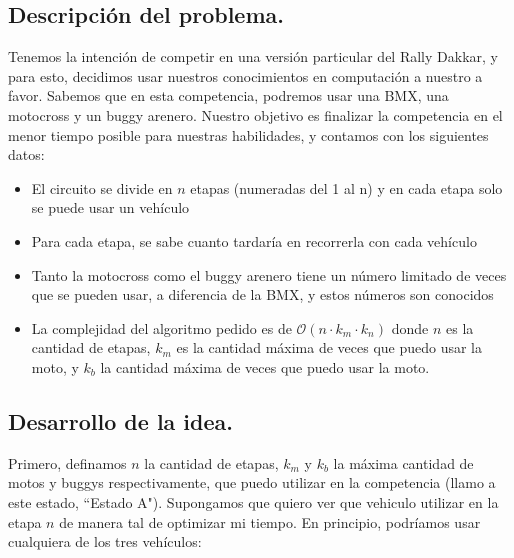 \subsection{Descripción del problema.}

\vspace*{0.3cm}

Tenemos la intención de competir en una versión particular del Rally Dakkar, y para esto, decidimos usar nuestros conocimientos en computación a nuestro a favor. Sabemos que en esta competencia, podremos usar una BMX, una motocross y un buggy arenero. Nuestro objetivo es finalizar la competencia en el menor tiempo posible para nuestras habilidades, y contamos con los siguientes datos:

\begin{itemize}

	\item El circuito se divide en $n$ etapas (numeradas del 1 al n) y en cada etapa solo se puede usar un vehículo
	\item Para cada etapa, se sabe cuanto tardaría en recorrerla con cada vehículo
	\item Tanto la motocross como el buggy arenero tiene un número limitado de veces que se pueden usar, a diferencia de la BMX, y estos números son conocidos
	\item La complejidad del algoritmo pedido es de $\mathcal{O}(n \cdot k_{m} \cdot k_{n})$ donde $n$ es la cantidad de etapas, $k_{m}$ es la cantidad máxima de veces que puedo usar la moto, y $k_{b}$ la cantidad máxima de veces que puedo usar la moto.

\end{itemize}

\vspace*{0.6cm}
\subsection{Desarrollo de la idea.}

\vspace*{0.3cm}
Primero, definamos $n$ la cantidad de etapas, $k_{m}$ y $k_{b}$ la máxima cantidad de motos y buggys respectivamente, que puedo utilizar en la competencia (llamo a este estado, ``Estado A"). Supongamos que quiero ver que vehiculo utilizar en la etapa $n$ de manera tal de optimizar mi tiempo. En principio, podríamos usar cualquiera de los tres vehículos: 


